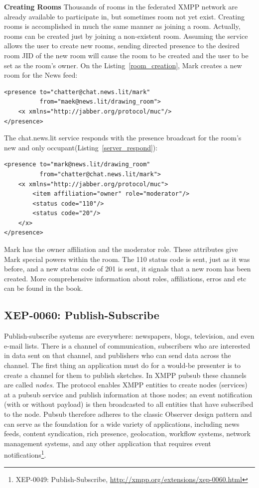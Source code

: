 \textbf{Creating Rooms}
Thousands of rooms in the federated XMPP network are already available to participate in, but sometimes room not yet exist. Creating rooms is accomplished in much the same manner as joining a room. Actually, rooms can be created just by joining a non-existent room. Assuming the service allows the user to create new rooms, sending directed presence to the desired room JID of the new room will cause the room to be created and the user to be set as the room’s owner. On the Listing~\ref{room_creation}, Mark creates a new room for the News feed:
	\begin{lstlisting}[label=room_creation,caption=MUC Room Creation]
<presence to="chatter@chat.news.lit/mark"
          from="maek@news.lit/drawing_room">
    <x xmlns="http://jabber.org/protocol/muc"/>
</presence>
	\end{lstlisting}

The chat.news.lit service responds with the presence broadcast for the room’s new and only occupant(Listing~\ref{server_respond}):
	\begin{lstlisting}[label=server_respond,caption=Server Respond to Room Creation]
<presence to="mark@news.lit/drawing_room"
          from="chatter@chat.news.lit/mark">
    <x xmlns="http://jabber.org/protocol/muc">
        <item affiliation="owner" role="moderator"/>
        <status code="110"/>
        <status code="20"/>
    </x>
</presence>
		\end{lstlisting}

Mark has the owner affiliation and the moderator role. These attributes give Mark special powers within the room. The 110 status code is sent, just as it was before, and a new status code of 201 is sent, it signals that a new room has been created. More comprehensive information about roles, affiliations, erros and etc can be found in the book\cite{XMPPbook}.

\subsection{XEP-0060: Publish-Subscribe}
Publish-subscribe systems are everywhere: newspapers, blogs, television, and even e-mail lists. There is a channel of communication, subscribers who are interested in data sent on that channel, and publishers who can send data across the channel. The first thing an application must do for a would-be presenter is to create a channel for them to publish sketches. In XMPP pubsub these channels are called \emph{nodes}. The protocol enables XMPP entities to create nodes (services) at a pubsub service and publish information at those nodes; an event notification (with or without payload) is then broadcasted to all entities that have subscribed to the node. Pubsub therefore adheres to the classic Observer design pattern and can serve as the foundation for a wide variety of applications, including news feeds, content syndication, rich presence, geolocation, workflow systems, network management systems, and any other application that requires event notifications\footnote{XEP-0049: Publish-Subscribe, \url{http://xmpp.org/extensions/xep-0060.html}}.

